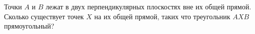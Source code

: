 Точки $A$ и $B$ лежат в двух перпендикулярных плоскостях вне их общей прямой. Сколько существует точек $X$ на их общей прямой, таких что треугольник $AXB$ прямоугольный?
